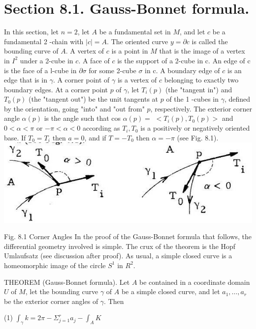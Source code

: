 \documentclass[10pt]{article}
\begin{document}
\section{Section 8.1. Gauss-Bonnet formula.}
In this section, let $n=2$, let $A$ be a fundamental set in $M$, and let $c$ be a fundamental 2 -chain with $|c|=A$. The oriented curve $y=\partial c$ is called the bounding curve of $A$. A vertex of $c$ is a point in $M$ that is the image of a vertex in $I^{2}$ under a 2-cube in $c .$ A face of $c$ is the support of a 2-cube in c. An edge of $\mathrm{c}$ is the face of a l-cube in $\partial \sigma$ for some 2-cube $\sigma$ in c. A boundary edge of $c$ is an edge that is in $\gamma$. A corner point of $\gamma$ is a vertex of $c$ belonging to exactly two boundary edges. At a corner point $p$ of $\gamma$, let $T_{i}(p)$ (the "tangent in") and $T_{0}(p)$ (the "tangent out") be the unit tangents at $p$ of the 1 -cubes in $\gamma$, defined by the orientation, going "into" and "out from" $p$, respectively. The exterior corner angle $\alpha(p)$ is the angle such that cos $\alpha(p)=$ $<T_{i}(p), T_{0}(p)>$ and $0<\alpha<\pi$ or $-\pi<\alpha<0$ according as $T_{i}, T_{0}$ is a positively or negatively oriented base. If $T_{0}=T_{i}$ then $a=0$, and if $T=-T_{0}$ then $\alpha=-\pi$ (see Fig. 8.1).\\

\includegraphics[max width=\textwidth]{2022_07_16_f4e476ee2159dc67e746g-56}

Fig. 8.1 Corner Angles In the proof of the Gauss-Bonnet formula that follows, the differential geometry involved is simple. The crux of the theorem is the Hopf Umlaufsatz (see discussion after proof). As usual, a simple closed curve is a homeomorphic image of the circle $S^{1}$ in $R^{2}$.

THEOREM (Gauss-Bonnet formula). Let $A$ be contained in a coordinate domain $U$ of $M$, let the bounding curve $\gamma$ of $A$ be a simple closed curve, and let $a_{1}, \ldots, a_{r}$ be the exterior corner angles of $\gamma$. Then

(1) $\int_{\gamma} k=2 \pi-\Sigma_{j=1}^{r} a_{j}-\int_{A} K$
\end{document}
